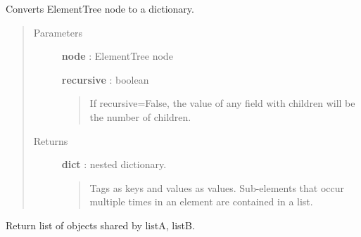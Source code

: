 \documentclass[letterpaper,10pt,english]{sphinxmanual}
\begin{document}
\begin{fulllineitems}
\label{tethne.utilities:tethne.utilities.dict_from_node}
Converts ElementTree node to a dictionary.
\begin{quote}\begin{description}
\item[{Parameters}] \leavevmode
\textbf{node} : ElementTree node

\textbf{recursive} : boolean
\begin{quote}

If recursive=False, the value of any field with children will be the
number of children.
\end{quote}

\item[{Returns}] \leavevmode
\textbf{dict} : nested dictionary.
\begin{quote}

Tags as keys and values as values. Sub-elements that occur multiple
times in an element are contained in a list.
\end{quote}

\end{description}\end{quote}

\end{fulllineitems}


\begin{fulllineitems}
\label{tethne.utilities:tethne.utilities.overlap}
Return list of objects shared by listA, listB.

\end{fulllineitems}

\end{document}
